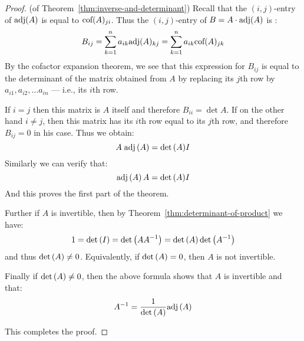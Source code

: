 \begin{proof} (of Theorem~\ref{thm:inverse-and-determinant})
Recall that the $(i,j)$-entry of $\mbox{\rm adj}(A)$ is equal to $\mbox{\rm cof}(A)_{ji}$.  Thus the $(i,j)$-entry of   $B=A\cdot \mbox{\rm adj}(A)$ is : 
\[
B_{ij}=\sum_{k=1}^n a_{ik} \mbox{\rm adj} (A)_{kj}= \sum_{k=1}^n a_{ik} \mbox{\rm cof} (A)_{jk}
\]
By the cofactor expansion theorem, we see that this expression for $B_{ij}$ is equal to the determinant of the
matrix obtained from $A$ by replacing its $j$th  row  by $a_{i1}, a_{i2}, \dots a_{in}$ --- i.e., its $i$th row. 

If $i=j$ then this matrix is $A$ itself and therefore $B_{ii}=\det
A$. If on the other hand $i\neq j$, then this matrix has its $i$th row
equal to its $j$th row, and therefore $B_{ij}=0$ in his case. Thus we obtain: 
\begin{equation*}
A \; \mbox{\rm adj}\left(A\right) = {\det \left(A\right)} I
\end{equation*}
Similarly we can verify that:
\begin{equation*}
\mbox{\rm adj}\left(A\right)A = {\det \left(A\right)} I
\end{equation*}
And this proves the first part of the theorem. 

Further if $A$ is  invertible, then by Theorem~\ref{thm:determinant-of-product} we have:
\[ 1 = \det \left(I \right) = \det \left(A A^{-1} \right) = \det \left(A \right) \det \left(A^{-1} \right) \]
and thus $\det \left(A \right) \neq 0$. Equivalently, if  $\det \left(A \right) = 0$, then $A$ is not invertible. 

Finally if $\det \left(A \right) \neq 0$, then the above formula shows that $A$ is invertible and that:
\begin{equation*}
A^{-1} = \frac{1}{\det \left(A\right)} \mbox{\rm adj}\left(A\right)
\end{equation*}

This completes the proof.
\end{proof}


